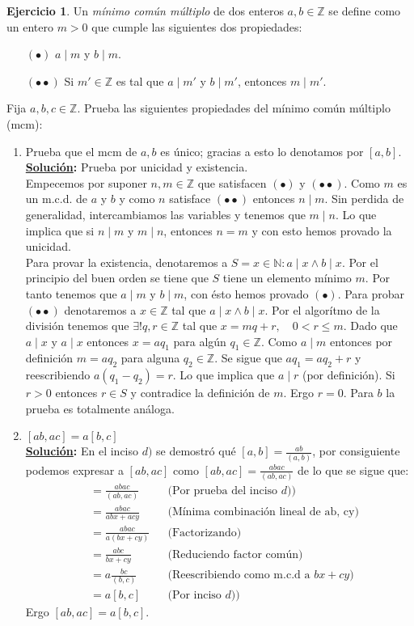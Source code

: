 \documentclass[11pt,letterpaper]{article}
\theoremstyle{definition}\newtheorem{p}{Ejercicio}
\theoremstyle{definition}\newtheorem{pp}[p]{$(*)$Ejercicio}
\numberwithin{p}{section}
\newcommand{\Z}{\mathbb{Z}}
\newcommand{\N}{\mathbb{N}}
\newcommand{\sol}{\textbf{\underline{Solución}: }} %
\begin{document}
\begin{p}
  Un \emph{m\'inimo com\'un m\'ultiplo} de dos enteros $a,b\in\Z$ se define como un entero $m> 0$
  que cumple las siguientes dos propiedades:
  \begin{enumerate}
  \item[$(\bullet)$] $a\mid m$ y $b\mid m$.
  \item[$(\bullet\bullet)$] Si $m'\in\Z$ es tal que $a\mid m'$ y $b\mid m'$, entonces $m\mid m'$.
  \end{enumerate}
  Fija $a,b,c\in\Z$. Prueba las siguientes propiedades del m\'inimo com\'un m\'ultiplo (mcm):
  \begin{enumerate}
  \item Prueba que el mcm de $a,b$ es \'unico; gracias a esto lo denotamos por $[a,b]$.\\
  \sol Prueba por unicidad y existencia.\\
  Empecemos por suponer $n,m \in \Z$ que satisfacen $(\bullet)$ y 
  $(\bullet \bullet)$. Como $m$ es un m.c.d. de $a$ y $b$ y como $n$ satisface $(\bullet \bullet)$ 
  entonces $n \mid m$. Sin perdida de generalidad, intercambiamos las variables y tenemos que
  $m \mid n$. Lo que implica que si $n \mid m$ y $m \mid n$, entonces $n=m$ y con esto 
  hemos provado la unicidad.\\
  Para provar la existencia, denotaremos a $S = {x \in \N : a \mid x \land b \mid x}$. Por el 
  principio del buen orden se tiene que $S$ tiene un elemento mínimo $m$. Por tanto tenemos que 
  $a \mid m$ y $b \mid m$, con ésto hemos provado $(\bullet)$. Para probar $(\bullet \bullet)$ 
  denotaremos a $x \in \Z$ tal que $a \mid x \land b \mid x$. Por el algorítmo de la división 
  tenemos que $\exists! q, r \in \Z$ tal que $x = mq+r, \quad 0 < r \leq m$. Dado que $a \mid x$
  y $a \mid x$ entonces $x = aq_1$ para algún $q_1 \in \Z$. Como $a \mid m$ entonces por definición 
  $m = aq_2$ para alguna $q_2 \in \Z$. Se sigue que $aq_1 = aq_2+r$ y reescribiendo $a(q_1 - q_2)= r$. 
  Lo que implica que $a \mid r$ (por definición). Si $r>0$ entonces $r \in S$ y contradice la 
  definición de $m$. Ergo $r = 0$. Para $b$ la prueba es totalmente análoga.
  
  \item $[ab,ac]=a[b,c]$\\
  \sol En el inciso $d)$ se demostró qué $[a,b]=\frac{ab}{(a,b)}$, por consiguiente podemos expresar a
  $[ab,ac]$ como $[ab,ac]=\frac{abac}{(ab,ac)}$ de lo que se sigue que:
  \begin{align*}
  [ab,ac]
      &= \frac{abac}{(ab,ac)} && \text{(Por prueba del inciso $d)$)}\\
      &= \frac{abac}{abx+acy} && \text{(Mínima combinación lineal de ab, cy)}\\
      &= \frac{abac}{a(bx + cy)} && \text{(Factorizando)}\\
      &= \frac{abc}{bx+cy} && \text{(Reduciendo factor común)}\\
      &= a \frac{bc}{(b,c)} && \text{(Reescribiendo como m.c.d a $bx+cy$)}\\
      &= a [b, c] && \text{(Por inciso $d)$)}
  \end{align*}
  Ergo $[ab,ac]=a[b,c]$.
  

\end{enumerate}
\end{p}
\end{document}
